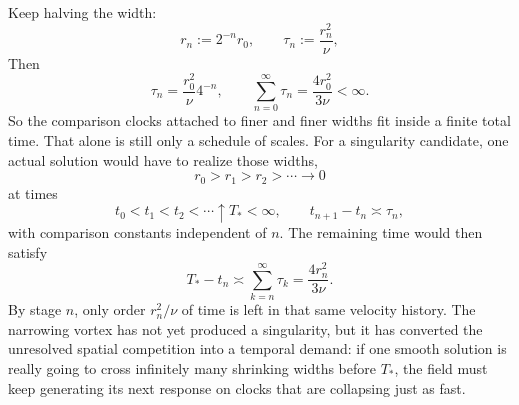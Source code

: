 Keep halving the width:
\[
  r_n:=2^{-n}r_0,
  \qquad
  \tau_n:=\frac{r_n^2}{\nu},
\]
Then
\[
  \tau_n
  =
  \frac{r_0^2}{\nu}4^{-n},
  \qquad
  \sum_{n=0}^{\infty}\tau_n
  =
  \frac{4r_0^2}{3\nu}
  <
  \infty.
\]
So the comparison clocks attached to finer and finer widths fit inside a finite total time. That alone is still only a schedule of scales. For a singularity candidate, one actual solution would have to realize those widths,
\[
  r_0>r_1>r_2>\cdots\longrightarrow0
\]
at times
\[
  t_0<t_1<t_2<\cdots\uparrow T_*<\infty,
  \qquad
  t_{n+1}-t_n\asymp\tau_n,
\]
with comparison constants independent of \(n\). The remaining time would then satisfy
\[
  T_*-t_n
  \asymp
  \sum_{k=n}^{\infty}\tau_k
  =
  \frac{4r_n^2}{3\nu}.
\]
By stage \(n\), only order \(r_n^2/\nu\) of time is left in that same velocity history. The narrowing vortex has not yet produced a singularity, but it has converted the unresolved spatial competition into a temporal demand: if one smooth solution is really going to cross infinitely many shrinking widths before \(T_*\), the field must keep generating its next response on clocks that are collapsing just as fast.
